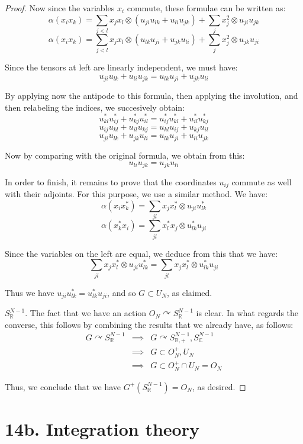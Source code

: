 \documentclass[12pt]{amsbook}
\begin{document}
\begin{proof}
Now since the variables $x_i$ commute, these formulae can be written as:
$$\alpha(x_ix_k)=\sum_{j<l}x_jx_l\otimes(u_{ji}u_{lk}+u_{li}u_{jk})+\sum_jx_j^2\otimes u_{ji}u_{jk}$$
$$\alpha(x_ix_k)=\sum_{j<l}x_jx_l\otimes(u_{lk}u_{ji}+u_{jk}u_{li})+\sum_jx_j^2\otimes u_{jk}u_{ji}$$

Since the tensors at left are linearly independent, we must have:
$$u_{ji}u_{lk}+u_{li}u_{jk}=u_{lk}u_{ji}+u_{jk}u_{li}$$

By applying now the antipode to this formula, then applying the involution, and then relabeling the indices, we succesively obtain:
$$u_{kl}^*u_{ij}^*+u_{kj}^*u_{il}^*=u_{ij}^*u_{kl}^*+u_{il}^*u_{kj}^*$$
$$u_{ij}u_{kl}+u_{il}u_{kj}=u_{kl}u_{ij}+u_{kj}u_{il}$$
$$u_{ji}u_{lk}+u_{jk}u_{li}=u_{lk}u_{ji}+u_{li}u_{jk}$$

Now by comparing with the original formula, we obtain from this:
$$u_{li}u_{jk}=u_{jk}u_{li}$$

In order to finish, it remains to prove that the coordinates $u_{ij}$ commute as well with their adjoints. For this purpose, we use a similar method. We have:
$$\alpha(x_ix_k^*)=\sum_{jl}x_jx_l^*\otimes u_{ji}u_{lk}^*$$
$$\alpha(x_k^*x_i)=\sum_{jl}x_l^*x_j\otimes u_{lk}^*u_{ji}$$

Since the variables on the left are equal, we deduce from this that we have:
$$\sum_{jl}x_jx_l^*\otimes u_{ji}u_{lk}^*=\sum_{jl}x_jx_l^*\otimes u_{lk}^*u_{ji}$$

Thus we have $u_{ji}u_{lk}^*=u_{lk}^*u_{ji}$, and so $G\subset U_N$, as claimed.

\medskip

\underline{$S^{N-1}_\mathbb R$}. The fact that we have an action $O_N\curvearrowright S^{N-1}_\mathbb R$ is clear. In what regards the converse, this follows by combining the results that we already have, as follows:
\begin{eqnarray*}
G\curvearrowright S^{N-1}_\mathbb R
&\implies&G\curvearrowright S^{N-1}_{\mathbb R,+},S^{N-1}_\mathbb C\\
&\implies&G\subset O_N^+,U_N\\
&\implies&G\subset O_N^+\cap U_N=O_N 
\end{eqnarray*}

Thus, we conclude that we have $G^+(S^{N-1}_\mathbb R)=O_N$, as desired.
\end{proof}

\section*{14b. Integration theory} 
\end{document}

